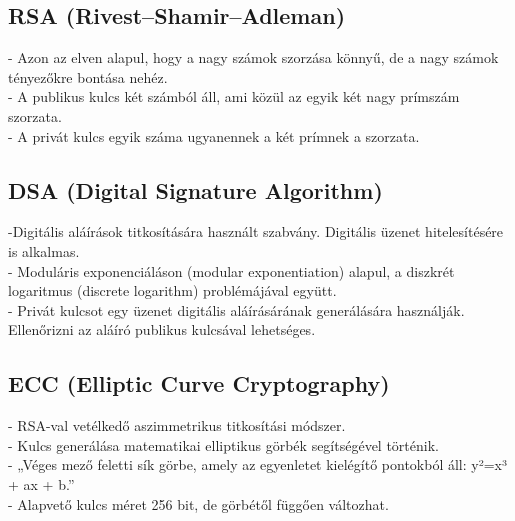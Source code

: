 \subsection{RSA (Rivest–Shamir–Adleman)}
\noindent - Azon az elven alapul, hogy a nagy számok szorzása könnyű, de a nagy számok tényezőkre bontása nehéz. 
\vspace{5pt}\\- A publikus kulcs két számból áll, ami közül az egyik két nagy prímszám szorzata.
\vspace{5pt}\\- A privát kulcs egyik száma ugyanennek a két prímnek a szorzata.


\subsection{DSA (Digital Signature Algorithm)}
\noindent-Digitális aláírások titkosítására használt szabvány. Digitális üzenet hitelesítésére is alkalmas.
\vspace{5pt}\\- Moduláris exponenciáláson (modular exponentiation) alapul, a diszkrét logaritmus (discrete logarithm) problémájával együtt.
\vspace{5pt}\\- Privát kulcsot egy üzenet digitális aláírásárának generálására használják. Ellenőrizni az aláíró publikus kulcsával lehetséges.


\subsection{ECC (Elliptic Curve Cryptography)}
\noindent- RSA-val vetélkedő aszimmetrikus titkosítási módszer.
\vspace{5pt}\\- Kulcs generálása matematikai elliptikus görbék segítségével történik.
\vspace{5pt}\\- „Véges mező feletti sík görbe, amely az egyenletet kielégítő pontokból áll: y²=x³ + ax + b.”
\vspace{5pt}\\- Alapvető kulcs méret 256 bit, de görbétől függően változhat.

